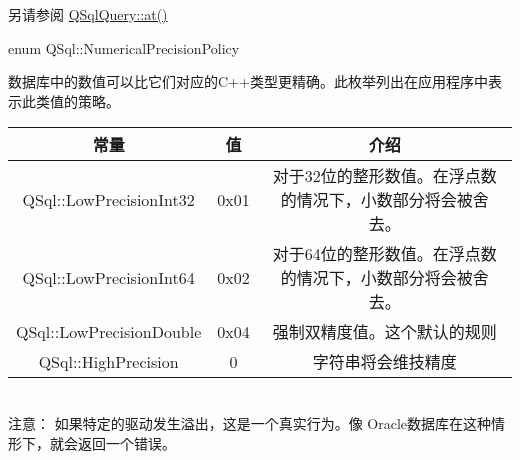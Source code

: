 另请参阅 \href{https://doc.qt.io/qt-5/qsqlquery.html#at}{QSqlQuery::at()}

enum QSql::NumericalPrecisionPolicy


数据库中的数值可以比它们对应的C++类型更精确。此枚举列出在应用程序中表示此类值的策略。


\begin{tabular}{|c|c|c|}
	\hline
	常量	& 值 & 介绍 \\
	\hline
	QSql::LowPrecisionInt32	&0x01 &对于32位的整形数值。在浮点数的情况下，小数部分将会被舍去。\\
	\hline
	QSql::LowPrecisionInt64	&0x02 &对于64位的整形数值。在浮点数的情况下，小数部分将会被舍去。\\
	\hline
	QSql::LowPrecisionDouble&0x04 &强制双精度值。这个默认的规则\\
	\hline
	QSql::HighPrecision	&0&字符串将会维技精度\\
	\hline
\end{tabular}\\

注意： 如果特定的驱动发生溢出，这是一个真实行为。像 Oracle数据库在这种情形下，就会返回一个错误。



